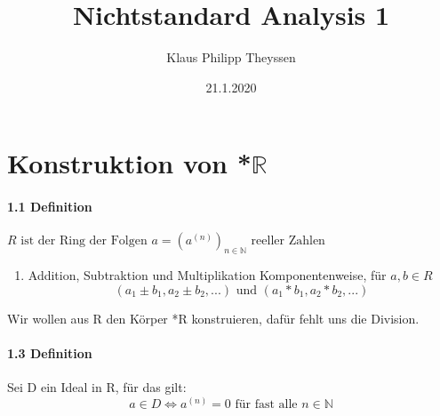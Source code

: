 \documentclass[a4paper]{article}
\title{Nichtstandard Analysis 1}
\date{21.1.2020}
\author{Klaus Philipp Theyssen}
\begin{document}
\maketitle



\section{Konstruktion von *$\mathbb{R}$}
\paragraph{1.1 Definition} $ R \text{ ist der Ring der Folgen }  a = (a^{(n)})_{n \in \mathbb{N}} \text{ reeller Zahlen} $
\begin{enumerate}
      \item Addition, Subtraktion und Multiplikation Komponentenweise, für $a, b \in R$  
            $$ (a_1 \pm b_1, a_2 \pm b_2,...) \text{ und } (a_1 * b_1, a_2 * b_2,...) $$ 
\end{enumerate}
\smallskip
Wir wollen aus R den Körper *R konstruieren, dafür fehlt uns die Division. 


\paragraph{1.3 Definition} Sei D ein Ideal in R, für das gilt:  
      $$ a \in D \iff a^{(n)} = 0 \text{ für fast alle } n \in \mathbb{N}  $$
\end{document}
